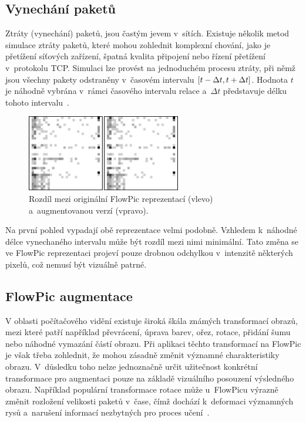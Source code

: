 \subsection{Vynechání paketů}
Ztráty (vynechání) paketů, jsou častým jevem v~sítích. Existuje několik metod simulace ztráty paketů, které mohou zohlednit komplexní chování, jako je přetížení síťových zařízení, špatná kvalita připojení nebo řízení přetížení v~protokolu TCP. Simulaci lze provést na jednoduchém procesu ztráty, při němž jsou všechny pakety odstraněny v~časovém intervalu $[t \-- \Delta t, t + \Delta t]$. Hodnota $t$ je náhodně vybrána v~rámci časového intervalu relace a~$\Delta t$ představuje délku tohoto intervalu~\cite{flowpic_augmentations}.

\begin{figure}[H]
	\centering
	\includegraphics[width=0.6\textwidth]{obrazky-figures/pktl_and_orig.png}
	\caption{Rozdíl mezi originální FlowPic reprezentací (vlevo) a~augmentovanou verzí (vpravo).}
	\label{flowpic_pktl}
\end{figure}

Na první pohled vypadají obě reprezentace velmi podobně. Vzhledem k~náhodné délce vynechaného intervalu může být rozdíl mezi nimi minimální. Tato změna se ve FlowPic reprezentaci projeví pouze drobnou odchylkou v~intenzitě některých pixelů, což nemusí být vizuálně patrné.

\subsection{FlowPic augmentace}
\label{flowpic_augmentace}
V oblasti počítačového vidění existuje široká škála známých transformací obrazů, mezi které patří například převrácení, úprava barev, ořez, rotace, přidání šumu nebo náhodné vymazání částí obrazu. Při aplikaci těchto transformací na FlowPic je však třeba zohlednit, že mohou zásadně změnit významné charakteristiky obrazu. V~důsledku toho nelze jednoznačně určit užitečnost konkrétní transformace pro augmentaci pouze na základě vizuálního posouzení výsledného obrazu. Například populární transformace rotace může u~FlowPicu výrazně změnit rozložení velikosti paketů v~čase, čímž dochází k~deformaci významných rysů a~narušení informací nezbytných pro proces učení~\cite{flowpic_augmentations}. 

